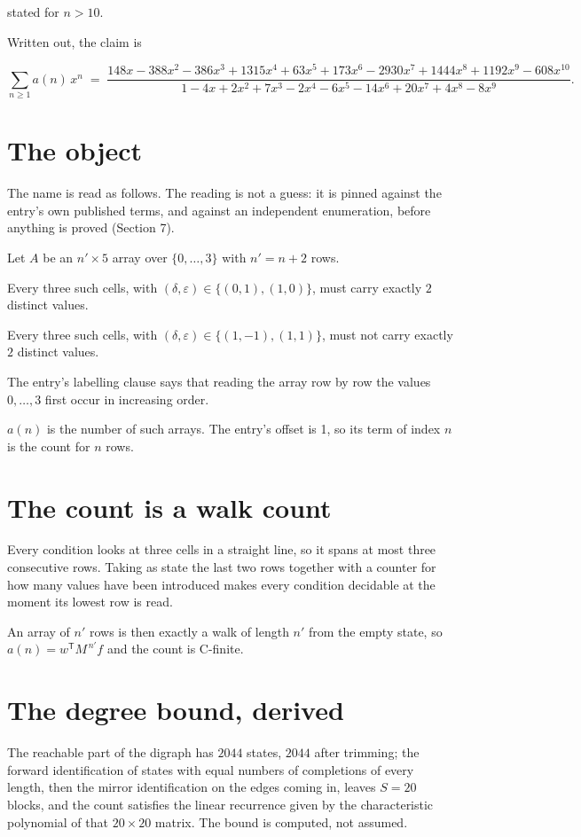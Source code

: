 \documentclass[11pt]{article}
\theoremstyle{definition}
\begin{document}
stated for $n > 10$.

Written out, the claim is

\[\sum_{n \ge 1} a(n)\,x^n \;=\; \frac{148x - 388x^{2} - 386x^{3} + 1315x^{4} + 63x^{5} + 173x^{6} - 2930x^{7} + 1444x^{8} + 1192x^{9} - 608x^{10}}{1 - 4x + 2x^{2} + 7x^{3} - 2x^{4} - 6x^{5} - 14x^{6} + 20x^{7} + 4x^{8} - 8x^{9}}.\]

\section{The object}

The name is read as follows. The reading is not a guess: it is pinned against the entry's own published terms, and against an independent enumeration, before anything is proved (Section 7).

Let $A$ be an $n' \times 5$ array over $\{0,\dots,3\}$ with $n' = n + 2$ rows.

Every three such cells, with $(\delta,\varepsilon) \in \{(0,1), (1,0)\}$, must carry exactly $2$ distinct values.

Every three such cells, with $(\delta,\varepsilon) \in \{(1,-1), (1,1)\}$, must not carry exactly $2$ distinct values.

The entry's labelling clause says that reading the array row by row the values $0,\dots,3$ first occur in increasing order.

$a(n)$ is the number of such arrays. The entry's offset is 1, so its term of index $n$ is the count for $n$ rows.

\section{The count is a walk count}

Every condition looks at three cells in a straight line, so it spans at most three consecutive rows. Taking as state the last two rows together with a counter for how many values have been introduced makes every condition decidable at the moment its lowest row is read.

An array of $n'$ rows is then exactly a walk of length $n'$ from the empty state, so $a(n) = w^{\mathsf T}M^{\,n'}f$ and the count is C-finite.

\section{The degree bound, derived}

The reachable part of the digraph has $2044$ states, $2044$ after trimming; the forward identification of states with equal numbers of completions of every length, then the mirror identification on the edges coming in, leaves $S = 20$ blocks, and the count satisfies the linear recurrence given by the characteristic polynomial of that $20\times20$ matrix. The bound is computed, not assumed.
\end{document}
